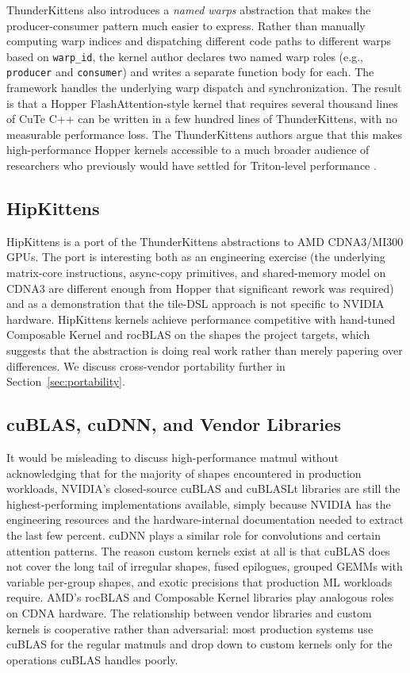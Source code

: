\documentclass[10pt]{article}
\begin{document}
ThunderKittens also introduces a \emph{named warps} abstraction that makes the producer-consumer pattern much easier to express. Rather than manually computing warp indices and dispatching different code paths to different warps based on \texttt{warp\_id}, the kernel author declares two named warp roles (e.g., \texttt{producer} and \texttt{consumer}) and writes a separate function body for each. The framework handles the underlying warp dispatch and synchronization. The result is that a Hopper FlashAttention-style kernel that requires several thousand lines of CuTe C++ can be written in a few hundred lines of ThunderKittens, with no measurable performance loss. The ThunderKittens authors argue that this makes high-performance Hopper kernels accessible to a much broader audience of researchers who previously would have settled for Triton-level performance \citep{spector2024thunderkittens}.

\subsection{HipKittens}
\label{sec:matmul-hk}

HipKittens \citep{hipkittens2025} is a port of the ThunderKittens abstractions to AMD CDNA3/MI300 GPUs. The port is interesting both as an engineering exercise (the underlying matrix-core instructions, async-copy primitives, and shared-memory model on CDNA3 are different enough from Hopper that significant rework was required) and as a demonstration that the tile-DSL approach is not specific to NVIDIA hardware. HipKittens kernels achieve performance competitive with hand-tuned Composable Kernel and rocBLAS on the shapes the project targets, which suggests that the abstraction is doing real work rather than merely papering over differences. We discuss cross-vendor portability further in Section~\ref{sec:portability}.

\subsection{cuBLAS, cuDNN, and Vendor Libraries}
\label{sec:matmul-vendor}

It would be misleading to discuss high-performance matmul without acknowledging that for the majority of shapes encountered in production workloads, NVIDIA's closed-source cuBLAS and cuBLASLt libraries are still the highest-performing implementations available, simply because NVIDIA has the engineering resources and the hardware-internal documentation needed to extract the last few percent. cuDNN plays a similar role for convolutions and certain attention patterns. The reason custom kernels exist at all is that cuBLAS does not cover the long tail of irregular shapes, fused epilogues, grouped GEMMs with variable per-group shapes, and exotic precisions that production ML workloads require. AMD's rocBLAS and Composable Kernel libraries play analogous roles on CDNA hardware. The relationship between vendor libraries and custom kernels is cooperative rather than adversarial: most production systems use cuBLAS for the regular matmuls and drop down to custom kernels only for the operations cuBLAS handles poorly.
\end{document}
